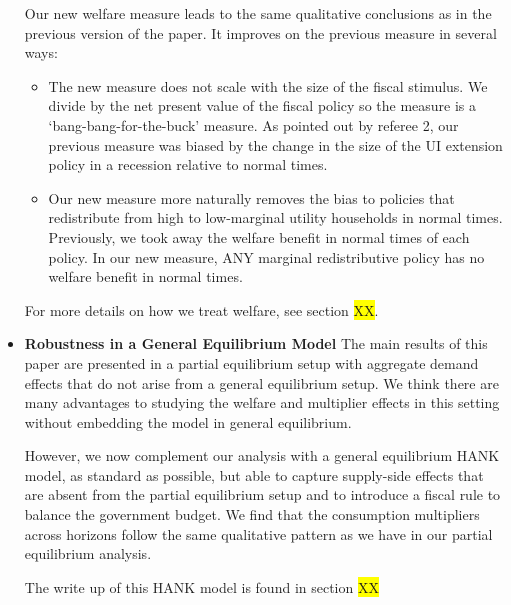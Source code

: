\begin{itemize}
	Our new welfare measure leads to the same qualitative conclusions as in the previous version of the paper. It improves on the previous measure in several ways:
	\begin{itemize}
		\item The new measure does not scale with the size of the fiscal stimulus. We divide by the net present value of the fiscal policy so the measure is a `bang-bang-for-the-buck' measure. As pointed out by referee 2, our previous measure was biased by the change in the size of the UI extension policy in a recession relative to normal times.
		\item Our new measure more naturally removes the bias to policies that redistribute from high to low-marginal utility households in normal times. Previously, we took away the welfare benefit in normal times of each policy. In our new measure, ANY marginal redistributive policy has no welfare benefit in normal times.
	\end{itemize}
	For more details on how we treat welfare, see section \colorbox{yellow}{XX}.
	
	\item \textbf{Robustness in a General Equilibrium Model}  The main results of this paper are presented in a partial equilibrium setup with aggregate demand effects that do not arise from a general equilibrium setup. We think there are many advantages to studying the welfare and multiplier effects in this setting without embedding the model in general equilibrium.
	
	However,  we now complement our analysis with a  general equilibrium HANK model, as standard as possible, but able to capture supply-side effects that are absent from the partial equilibrium setup and to introduce a fiscal rule to balance the government budget. We find that the consumption multipliers across horizons follow the same qualitative pattern as we have in our partial equilibrium analysis.
	
	The write up of this HANK model is found in section \colorbox{yellow}{XX}
	
	
\end{itemize}
